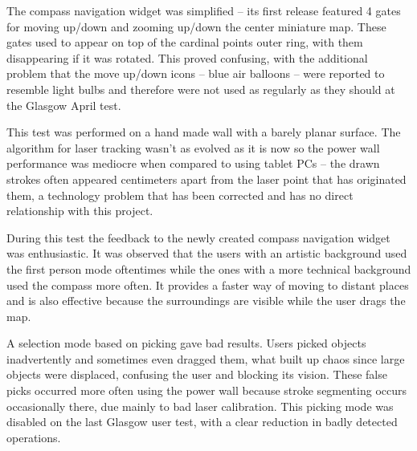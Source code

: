 The compass navigation widget was simplified -- its first release featured 4 gates for
moving up/down and zooming up/down the center miniature map. These gates used to appear on top
of the cardinal points outer ring, with them disappearing if it was rotated. This proved
confusing, with the additional problem that the move up/down icons -- blue air balloons --
were reported to resemble light bulbs and therefore were not used as regularly as they should at the Glasgow April test.

This test was performed on a hand made wall with a barely planar surface.
The algorithm for laser tracking wasn't as evolved as it is now so the power wall performance
was mediocre when compared to using tablet PCs -- the drawn strokes often appeared centimeters
apart from the laser point that has originated them, a technology problem that has been corrected
and has no direct relationship with this project.

During this test the feedback to the newly created compass navigation widget was enthusiastic.
It was observed that the users with an artistic background used the first person mode oftentimes while the
ones with a more technical background used the compass more often. It provides a faster way
of moving to distant places and is also effective because the surroundings are visible while
the user drags the map.

A selection mode based on picking gave bad results. Users picked objects inadvertently and
sometimes even dragged them, what built up chaos since large objects were displaced, confusing
the user and blocking its vision. These false picks occurred more often using the power wall
because stroke segmenting occurs occasionally there, due mainly to bad laser calibration.
This picking mode was disabled on the last Glasgow user test, with a clear reduction in
badly detected operations.

